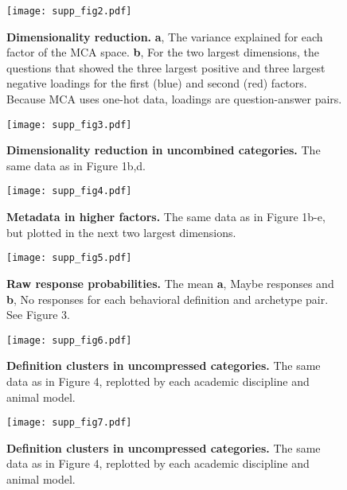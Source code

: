\documentclass[a4paper, 11pt]{article}
\begin{document}
\begin{figure}
\centerline{\texttt{[image: supp\_fig2.pdf]}}
\caption{\textbf{Dimensionality reduction.} \textbf{a}, The variance explained for each factor of the MCA space. \textbf{b}, For the two largest dimensions, the questions that showed the three largest positive and three largest negative loadings for the first (blue) and second (red) factors. Because MCA uses one-hot data, loadings are question-answer pairs.}
\end{figure}
\newpage

\begin{figure}
\centerline{\texttt{[image: supp\_fig3.pdf]}}
\caption{\textbf{Dimensionality reduction in uncombined categories.} The same data as in Figure 1b,d.}
\end{figure}
\newpage

\begin{figure}
\centerline{\texttt{[image: supp\_fig4.pdf]}}
\caption{\textbf{Metadata in higher factors.} The same data as in Figure 1b-e, but plotted in the next two largest dimensions.}
\end{figure}
\newpage

\begin{figure}
\centerline{\texttt{[image: supp\_fig5.pdf]}}
\caption{\textbf{Raw response probabilities.} The mean \textbf{a}, Maybe responses and \textbf{b}, No responses for each behavioral definition and archetype pair. See Figure 3.}
\end{figure}
\newpage

\begin{figure}
\centerline{\texttt{[image: supp\_fig6.pdf]}}
\caption{\textbf{Definition clusters in uncompressed categories.} The same data as in Figure 4, replotted by each academic discipline and animal model.}
\end{figure}
\newpage

\begin{figure}
\centerline{\texttt{[image: supp\_fig7.pdf]}}
\caption{\textbf{Definition clusters in uncompressed categories.} The same data as in Figure 4, replotted by each academic discipline and animal model.}
\end{figure}
\newpage

{\footnotesize }
% 

\end{document}
